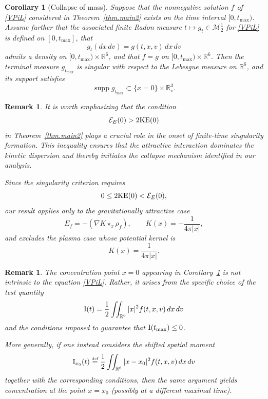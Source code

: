 \documentclass[reqno,11pt,final]{amsart}
\theoremstyle{plain}
\newtheorem{remark}[theorem]{Remark}
\newtheorem{corollary}[theorem]{Corollary}
\numberwithin{equation}{section}
\numberwithin{theorem}{section}
\newcommand{\eqdef }{\overset{\mbox{\tiny{def}}}{=}}
\begin{document}
\begin{corollary}[Collapse of mass]\label{collapse}
Suppose that the nonnegative solution $f$ of \eqref{VPiL} considered in
Theorem~\ref{thm.main2} exists on the time interval $[0,t_{\max})$.
Assume further that the associated finite Radon measure
$t\mapsto g_t\in \mathcal{M}^1_2$ for \eqref{VPiL} is defined on
$[0,t_{\max}]$, that
$$
g_t(dx\,dv)=g(t,x,v)\,dx\,dv
$$
admits a density on $[0,t_{\max})\times\mathbb{R}^6$, and that
$f=g$ on $[0,t_{\max})\times\mathbb{R}^6$.
Then the terminal measure $g_{t_{\max}}$ is singular with respect to the
Lebesgue measure on $\mathbb{R}^6$, and its support satisfies
$$
\operatorname{supp} g_{t_{\max}}
\subset
\{x=0\}\times\mathbb{R}^3_v .
$$
\end{corollary}
\begin{remark}
It is worth emphasizing that the condition
$$
\mathcal{E}_E(0)> 2\textup{KE}(0)
$$
in Theorem~\ref{thm.main2} plays a crucial role in the onset of
finite-time singularity formation. This inequality ensures that the
attractive interaction dominates the kinetic dispersion and thereby
initiates the collapse mechanism identified in our analysis.

Since the singularity criterion requires
$$
0 \le 2\textup{KE}(0) < \mathcal{E}_E(0),
$$
our result applies only to the gravitationally attractive case
$$
E_f = -(\nabla K\star_x\rho_f),
\qquad
K(x)=-\frac{1}{4\pi|x|},
$$
and excludes the plasma case whose potential kernel is
$$
K(x)=\frac{1}{4\pi|x|}.
$$
\end{remark}

\begin{remark}
The concentration point $x=0$ appearing in Corollary~\ref{collapse} is
not intrinsic to the equation \eqref{VPiL}. Rather, it arises from the
specific choice of the test quantity
$$
\textup{I}(t)=\frac{1}{2}\iint_{\mathbb{R}^6}|x|^2 f(t,x,v)\,dx\,dv
$$
and the conditions imposed to guarantee that
$\textup{I}(t_{\max})\le 0$.

More generally, if one instead considers the shifted spatial moment
$$
\textup{I}_{x_0}(t)
\eqdef
\frac{1}{2}\iint_{\mathbb{R}^6}|x-x_0|^2 f(t,x,v)\,dx\,dv
$$
together with the corresponding conditions, then the same argument
yields concentration at the point $x=x_0$ (possibly at a different
maximal time).
\end{remark}
\end{document}
